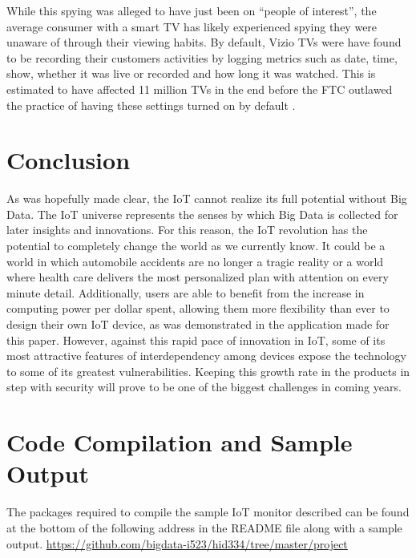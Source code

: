 \documentclass[sigconf]{acmart}
\begin{document}
While this spying was alleged to have just been on ``people of interest'', the average consumer with a smart TV has likely experienced spying they were unaware of through their viewing habits. By default, Vizio TVs were have found to be recording their customers activities by logging metrics such as date, time, show, whether it was live or recorded and how long it was watched. This is estimated to have affected 11 million TVs in the end before the FTC outlawed the practice of having these settings turned on by default \cite{smarttvsettle}. 

\section{Conclusion}
As was hopefully made clear, the IoT cannot realize its full potential without Big Data. The IoT universe represents the senses by which Big Data is collected for later insights and innovations. For this reason, the IoT revolution has the potential to completely change the world as we currently know. It could be a world in which automobile accidents are no longer a tragic reality or a world where health care delivers the most personalized plan with attention on every minute detail. Additionally, users are able to benefit from the increase in computing power per dollar spent, allowing them more flexibility than ever to design their own IoT device, as was demonstrated in the application made for this paper. However, against this rapid pace of innovation in IoT, some of its most attractive features of interdependency among devices expose the technology to some of its greatest vulnerabilities. Keeping this growth rate in the products in step with security will prove to be one of the biggest challenges in coming years. 

\appendix

\section{Code Compilation and Sample Output}
The packages required to compile the sample IoT monitor described can be found at the bottom of the following address in the README file along with a sample output. 
\url{https://github.com/bigdata-i523/hid334/tree/master/project}

\end{document}
